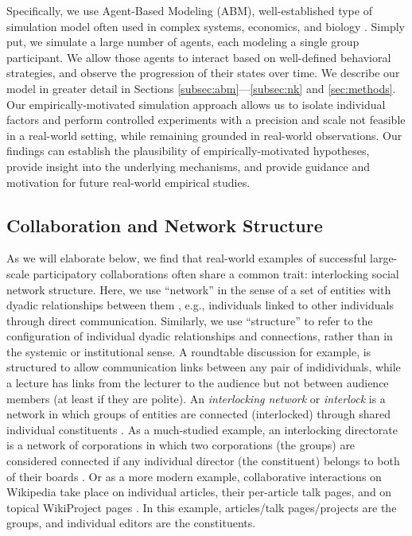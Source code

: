 \documentclass[manuscript,screen,review,acmsmall]{acmart}
\begin{document}
Specifically, we use Agent-Based Modeling (ABM),
well-established type of simulation model often used in complex systems,
economics, and biology
\cite{hong_groups_2004,
lazer_network_2007,
golub_naive_2010,
zollman_social_2012,
grim_scientific_2013,
barkoczi_social_2016,
gomez_clustering_2019}.
Simply put, we simulate a large number of agents, each modeling a single group participant.
We allow those agents to interact based on well-defined behavioral strategies,
and observe the progression of their states over time.
We describe our model in greater detail in
Sections \ref{subsec:abm}---\ref{subsec:nk} and \ref{sec:methods}.
Our empirically-motivated simulation approach allows us to isolate individual factors and perform controlled experiments with a precision and scale not feasible in a real-world setting, while remaining grounded in real-world observations.
Our findings can establish the plausibility of empirically-motivated hypotheses,
provide insight into the underlying mechanisms,
and provide guidance and motivation for future real-world empirical studies.

\subsection{Collaboration and Network Structure}
As we will elaborate below,
we find that real-world examples of successful large-scale participatory collaborations
often share a common trait:
interlocking social network structure.
Here, we use ``network'' in the sense of a set of entities with dyadic relationships between them \cite{newman_networks_2018}, e.g.,
individuals linked to other individuals through direct communication.
Similarly, we use ``structure'' to refer to the configuration of individual dyadic relationships and connections, rather than in the systemic or institutional sense. A roundtable discussion for example,
is structured to allow communication links between any pair of indidividuals, while a lecture has links from the lecturer to the audience but not between audience members (at least if they are polite).
An {\em interlocking network} or {\em interlock}
is a network in which groups of entities are connected (interlocked)
through shared individual constituents \cite{taylor_world_2015}.
As a much-studied example,
an interlocking directorate is a network of corporations
in which two corporations (the groups) are considered connected if any individual director (the constituent) belongs to both of their boards 
\cite{mizruchi_what_1996}.
Or as a more modern example,
collaborative interactions on Wikipedia take place on individual articles, their per-article talk pages, and on topical WikiProject pages \cite{platt_network_2018}.
In this example, articles/talk pages/projects are the groups, and individual editors are the constituents.
\end{document}

